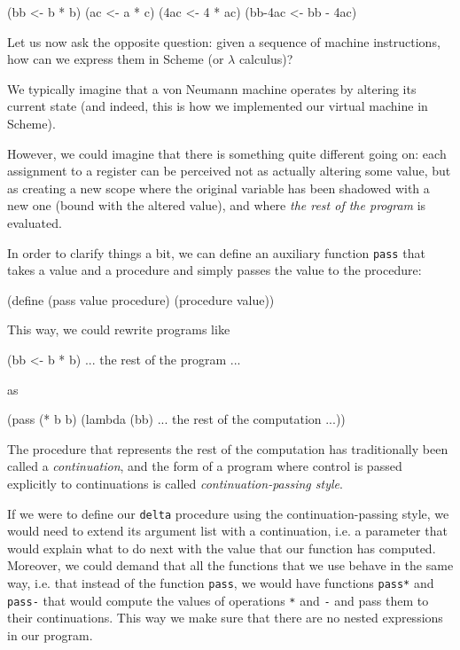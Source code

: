 \begin{Snippet}
  (bb <- b * b)
  (ac <- a * c)
  (4ac <- 4 * ac)
  (bb-4ac <- bb - 4ac)
\end{Snippet}

Let us now ask the opposite question: given a sequence of machine
instructions, how can we express them in Scheme (or $\lambda$ calculus)?

We typically imagine that a von Neumann machine operates by altering
its current state (and indeed, this is how we implemented our virtual
machine in Scheme).

However, we could imagine that there is something quite different
going on: each assignment to a register can be perceived not as
actually altering some value, but as creating a new scope where
the original variable has been shadowed with a new one (bound with
the altered value), and where \textit{the rest of the program}
is evaluated.

In order to clarify things a bit, we can define an auxiliary
function \texttt{pass} that takes a value and a procedure and
simply passes the value to the procedure:
\begin{Snippet}
  (define (pass value procedure)
    (procedure value))
\end{Snippet}

This way, we could rewrite programs like

\begin{Snippet}
  (bb <- b * b)
  ... the rest of the program ...
\end{Snippet}

as

\begin{Snippet}
  (pass (* b b)
    (lambda (bb)
      ... the rest of the computation ...))
\end{Snippet}

The procedure that represents the rest of the computation has
traditionally been called a \textit{continuation}, and the form
of a program where control is passed explicitly to continuations
is called \textit{continuation-passing style}\cite{SussmanSteele1976}.

If we were to define our \texttt{delta} procedure using the
continuation-passing style, we would need to extend its
argument list with a continuation, i.e. a parameter that
would explain what to do next with the value that our function
has computed. Moreover, we could demand that all the functions
that we use behave in the same way, i.e. that instead of the
function \texttt{pass}, we would have functions \texttt{pass*}
and \texttt{pass-} that would compute the values of operations
\texttt{*} and \texttt{-} and pass them to their continuations.
This way we make sure that there are no nested expressions
in our program.

